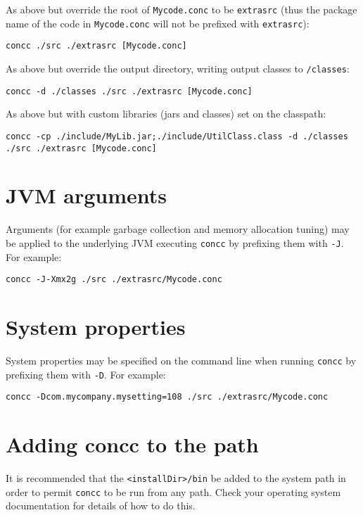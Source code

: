 \documentclass[conc-doc]{subfiles}
\begin{document}
As above but override the root of \lstinline[language=None]{Mycode.conc} to be \lstinline[language=None]{extrasrc} (thus the package name of the code in \lstinline[language=None]{Mycode.conc} will not be prefixed with \lstinline[language=None]{extrasrc}):
\begin{lstlisting}
concc ./src ./extrasrc [Mycode.conc]
\end{lstlisting}

As above but override the output directory, writing output classes to \lstinline[language=None]{/classes}:
\begin{lstlisting}
concc -d ./classes ./src ./extrasrc [Mycode.conc]
\end{lstlisting}

As above but with custom libraries (jars and classes) set on the classpath:
\begin{lstlisting}
concc -cp ./include/MyLib.jar;./include/UtilClass.class -d ./classes ./src ./extrasrc [Mycode.conc]
\end{lstlisting}

\section{JVM arguments}
Arguments (for example garbage collection and memory allocation tuning) may be applied to the underlying JVM executing \lstinline[language=None]{concc} by prefixing them with \lstinline[language=None]{-J}. For example:

\begin{lstlisting}[language=None]
concc -J-Xmx2g ./src ./extrasrc/Mycode.conc
\end{lstlisting}

\section{System properties}
System properties may be specified on the command line when running \lstinline[language=None]{concc} by prefixing them with \lstinline[language=None]{-D}. For example:

\begin{lstlisting}[language=None]
concc -Dcom.mycompany.mysetting=108 ./src ./extrasrc/Mycode.conc
\end{lstlisting}

\section{Adding concc to the path}
It is recommended that the \lstinline[language=None]{<installDir>/bin} be added to the system path in order to permit \lstinline[language=None]{concc} to be run from any path. Check your operating system documentation for details of how to do this.
\end{document}
